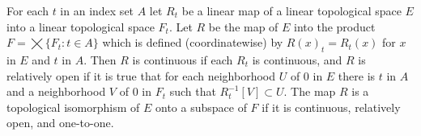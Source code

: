 For each $t$ in an index set $A$ let $R_t$ be a linear map of a linear topological space $E$ into a linear topological space $F_t$. Let $R$ be the map of $E$ into the product $F = \bigtimes \{F_t : t \in A\}$ which is defined (coordinatewise) by $R(x)_t = R_t(x)$ for $x$ in $E$ and $t$ in $A$. Then $R$ is continuous if each $R_t$ is continuous, and $R$ is relatively open if it is true that for each neighborhood $U$ of $0$ in $E$ there is $t$ in $A$ and a neighborhood $V$ of $0$ in $F_t$ such that $R_t^{-1}[V] \subset U$. The map $R$ is a topological isomorphism of $E$ onto a subspace of $F$ if it is continuous, relatively open, and one-to-one.
